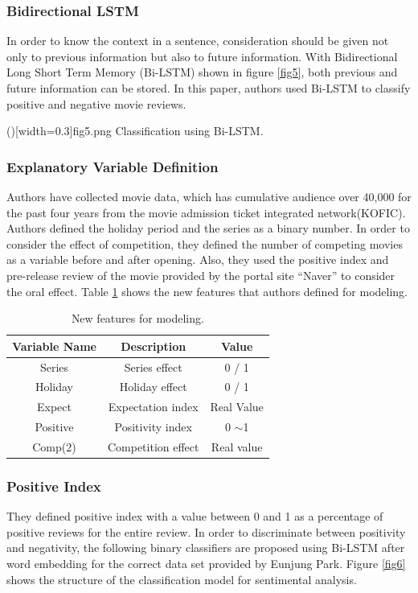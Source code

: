 \documentclass{ieeeaccess}
\begin{document}
\subsubsection{Bidirectional LSTM}
In order to know the context in a sentence, consideration should be given not only to previous information but also to future information. 
With Bidirectional Long Short Term Memory (Bi-LSTM) shown in figure \ref{fig5}, both previous and future information can be stored. 
In this paper, authors used Bi-LSTM to classify positive and negative movie reviews.

\Figure[t]()[width=0.3\textwidth]{fig5.png}
   {Classification using Bi-LSTM.\label{fig5}}

\subsubsection{Explanatory Variable Definition}
Authors have collected movie data, which has cumulative audience over 40,000 for the past four years from the movie admission ticket integrated network(KOFIC).
Authors defined the holiday period and the series as a binary number. 
In order to consider the effect of competition, they defined the number of competing movies as a variable before and after opening. 
Also, they used the positive index and pre-release review of the movie provided by the portal site ``Naver'' to consider the oral effect.
Table \ref{table4} shows the new features that authors defined for modeling.

\begin{table}[t]
	\centering
	\caption{New features for modeling.}
		\begin{tabular}{|c|c|c|}
			\hline
			\textbf{Variable Name} & \textbf{Description} & \textbf{Value} \\ \hline
			Series                 & Series effect        & 0 / 1          \\ \hline
			Holiday                & Holiday effect       & 0 / 1          \\ \hline
			Expect                 & Expectation index    & Real Value     \\ \hline
			Positive               & Positivity index     & 0 $\sim$1      \\ \hline
			Comp(2)                & Competition effect   & Real value     \\ \hline
		\end{tabular}
	\label{table4}
\end{table}

\subsubsection{Positive Index}
They defined positive index with a value between 0 and 1 as a percentage of positive reviews for the entire review. 
In order to discriminate between positivity and negativity, the following binary classifiers are proposed using Bi-LSTM after word embedding for the correct data set provided by Eunjung Park.
Figure \ref{fig6} shows the structure of the classification model for sentimental analysis.
\end{document}
